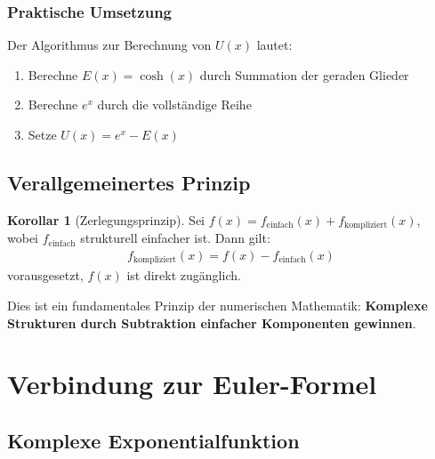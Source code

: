﻿\documentclass[a4paper,12pt]{article}
\theoremstyle{definition}
\newtheorem{korollar}{Korollar}
\begin{document}
\subsubsection{Praktische Umsetzung}

Der Algorithmus zur Berechnung von $U(x)$ lautet:
\begin{enumerate}
  \item Berechne $E(x) = \cosh(x)$ durch Summation der geraden Glieder
  \item Berechne $e^x$ durch die vollständige Reihe
  \item Setze $U(x) = e^x - E(x)$
\end{enumerate}

\subsection{Verallgemeinertes Prinzip}

\begin{korollar}[Zerlegungsprinzip]
Sei $f(x) = f_{\text{einfach}}(x) + f_{\text{kompliziert}}(x)$, wobei
$f_{\text{einfach}}$ strukturell einfacher ist. Dann gilt:
\begin{align}
  f_{\text{kompliziert}}(x) = f(x) - f_{\text{einfach}}(x)
\end{align}
vorausgesetzt, $f(x)$ ist direkt zugänglich.
\end{korollar}

Dies ist ein fundamentales Prinzip der numerischen Mathematik:
\textbf{Komplexe Strukturen durch Subtraktion einfacher Komponenten gewinnen}.

\section{Verbindung zur Euler-Formel}

\subsection{Komplexe Exponentialfunktion}
\end{document}
